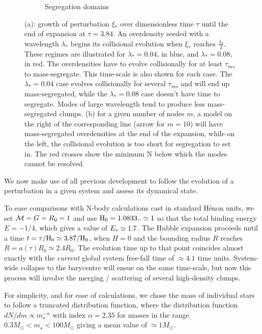 \begin{figure}
\begin{subfigure}[b]{0.49\textwidth}
        \caption{Segregation domains}
        \label{Fig:1_segregation_zone}
    \end{subfigure}
\caption{(a): growth of perturbation $\xi_*$ over dimensionless time $\tau$ until the end of expansion at $\tau = 3.84$. An overdensity seeded with a wavelength $\lambda_*$ begins its collisional evolution when $\xi_*$ reaches $\frac{\lambda_*}{2}$. These regimes are illustrated for $\lambda_* =0.04$, in blue, and  $\lambda_* =0.08$, in red. The overdensities have to evolve collisionally for at least $\tau_{ms}$ to mass-segregate. This time-scale is also shown for each case. The $\lambda_* =0.04$  case evolves collisionally for several $\tau_{ms}$ and will end up mass-segregated, while the $\lambda_* =0.08$ case doesn't have time to segregate. Modes of large wavelength tend to produce less mass-segregated clumps. (b) for a given number of nodes $m$, a model on the right of the corresponding line (arrow for $m=10$) will have mass-segregated overdensities at the end of the expansion, while on the left, the collisional evolution is too short for segregation to set in. The red crosses show the minimum N below which the modes cannot be resolved.} 
\label{Fig:0_perturbation_growth}
\end{figure}


We now make use of all previous development to follow the evolution of a perturbation in a given system and assess its dynamical state.

To ease comparisons with N-body calculations cast in standard H\'enon units, we set ${\cal M} = G = R_0 = 1 $ and use ${\textrm{H}}_0 = 1.0833 .. \simeq 1$ so that the total binding energy $E = -1/4$, which gives a value of $E_\ast \simeq 1.7$. The Hubble expansion proceeds until a time $t = \tau / {\textrm{H}}_0 \simeq 3.87 / {\textrm{H}}_0$, when $H = 0$ and the bounding radius $R$ reaches $R = a(\tau)R_0 \simeq 2.4 R_0$. The evolution time up to that point coincides almost exactly with the {\it current} global system free-fall time of $\approx 4.1$ time units. System-wide collapse to the barycentre will ensue on the same time-scale, but now this process will involve the merging / scattering of several high-density clumps. 

For simplicity, and for ease of calculations, we chose the mass of individual stars to follow a  truncated \cite{Salpeter1955} distribution function, where the distribution function $ dN/dm \propto m_\star^{-\alpha}$ with index $\alpha = 2.35$ for masses in the range  $0.3 M_\odot < m_\star < 100 M_\odot$ giving a mean value of $\simeq 1 M_\odot$.


